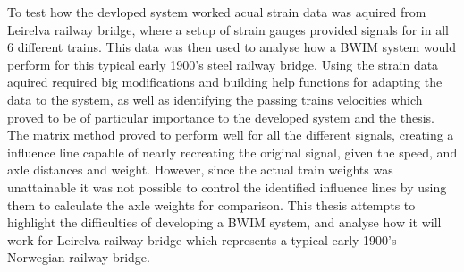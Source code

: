 To test how the devloped system worked acual strain data was aquired from Leirelva railway bridge, where a setup of strain gauges provided signals for in all 6 different trains.
This data was then used to analyse how a BWIM system would perform for this typical early 1900's steel railway bridge. Using the strain data aquired required big modifications and building help functions for adapting the data to the system, as well as identifying the passing trains velocities which proved to be of particular importance to the developed system and the thesis. The matrix method proved to perform well for all the different signals, creating a influence line capable of nearly recreating the original signal, given the speed, and axle distances and weight. However, since the actual train weights was unattainable it was not possible to control the identified influence lines by using them to calculate the axle weights for comparison.
This thesis attempts to highlight the difficulties of developing a BWIM system, and analyse how it will work for Leirelva railway bridge which represents a typical early 1900's Norwegian railway bridge.

\clearpage
